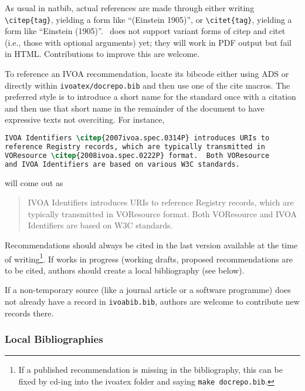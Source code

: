 \documentclass[11pt,a4paper]{ivoa}
\begin{document}
As usual in natbib, actual references are made through either writing
\verb|\citep{tag}|, yielding a form like ``(Einstein 1905)'',
or \verb|\citet{tag}|, yielding a form like ``Einstein (1905)''.
\ivoatex\ does not support variant forms of citep and citet (i.e., those
with optional arguments) yet; they will work in PDF output but fail in
HTML.  Contributions to improve this are welcome.

To reference an IVOA recommendation, locate its bibcode either using ADS
or directly within \texttt{ivoatex/docrepo.bib} and then use one of the
cite macros.  The preferred style is to introduce a short name for the
standard once with a citation and then use that short name in the
remainder of the document to have expressive texts not overciting. For
instance,

\begin{lstlisting}[language=tex]
IVOA Identifiers \citep{2007ivoa.spec.0314P} introduces URIs to
reference Registry records, which are typically transmitted in
VOResource \citep{2008ivoa.spec.0222P} format.  Both VOResource 
and IVOA Identifiers are based on various W3C standards.
\end{lstlisting}

will come out as

\begin{quotation}
IVOA Identifiers \citep{2007ivoa.spec.0314P} introduces URIs to
reference Registry records, which are typically transmitted in
VOResource \citep{2008ivoa.spec.0222P} format.  Both VOResource and IVOA
Identifiers are based on W3C standards.
\end{quotation}

Recommendations should always be cited in the last version available
at the time of writing\footnote{If a published recommendation is missing
in the bibliography, this can be fixed by cd-ing into the ivoatex folder
and saying \texttt{make docrepo.bib}.}.  If works in progress (working
drafts, proposed recommendations are to be cited, authors should create
a local bibliography (see below).

If a non-temporary source (like a journal article or a software
programme) does not already have a record in \texttt{ivoabib.bib},
authors are welcome to contribute new records there.

\subsubsection{Local Bibliographies}
\end{document}

